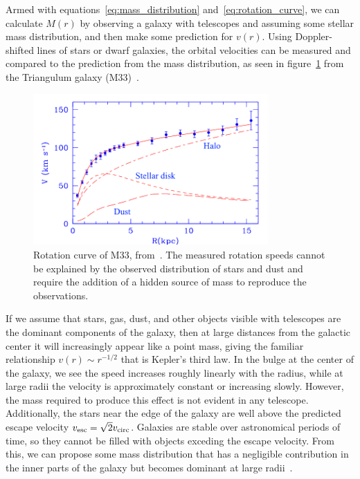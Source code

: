 Armed with equations~\eqref{eq:mass_distribution} and~\eqref{eq:rotation_curve}, we can calculate $M(r)$ by observing a galaxy with telescopes and assuming some stellar mass distribution, and then make some prediction for $v(r)$. Using Doppler-shifted lines of stars or dwarf galaxies, the orbital velocities can be measured and compared to the prediction from the mass distribution, as seen in figure~\ref{fig:rotation_curve} from the Triangulum galaxy (M33)~\cite{Corbelli:1999af}.

\begin{figure}[htb]
\centering
    \includegraphics[width=0.8\textwidth]{figures/dm/m33_rotation}
    \caption{Rotation curve of M33, from~\cite{Corbelli:1999af}. The measured rotation speeds cannot be explained by the observed distribution of stars and dust and require the addition of a hidden source of mass to reproduce the observations.}\label{fig:rotation_curve}
\end{figure}

If we assume that stars, gas, dust, and other objects visible with telescopes are the dominant components of the galaxy, then at large distances from the galactic center it will increasingly appear like a point mass, giving the familiar relationship $v(r) \sim r^{-1/2}$ that is Kepler's third law. In the bulge at the center of the galaxy, we see the speed increases roughly linearly with the radius, while at large radii the velocity is approximately constant or increasing slowly. However, the mass required to produce this effect is not evident in any telescope. Additionally, the stars near the edge of the galaxy are well above the predicted escape velocity $v_{\mathrm{esc}} = \sqrt{2}v_{\mathrm{circ}}$. Galaxies are stable over astronomical periods of time, so they cannot be filled with objects exceding the escape velocity. From this, we can propose some mass distribution that has a negligible contribution in the inner parts of the galaxy but becomes dominant at large radii~\cite{Navarro:1995iw,Graham:2005xx}.

